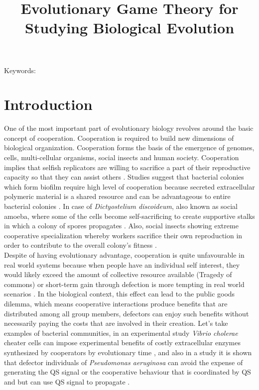 \documentclass{article}
\title{\vspace*{-22mm}\bf Evolutionary Game Theory for Studying Biological Evolution}
\date{}
\begin{document}
\linenumbers
\maketitle




\noindent
Keywords: 


\tableofcontents
\section{Introduction}
One of the most important part of evolutionary biology revolves around the basic concept of cooperation. Cooperation is required to build new dimensions of biological organization. Cooperation forms the basis of the emergence of genomes, cells, multi-cellular organisms, social insects and human society. Cooperation implies that selfish replicators are willing to sacrifice a part of their reproductive capacity so that they can assist others \citep{Nowak2006}.
Studies suggest that bacterial colonies which form biofilm require high level of cooperation because secreted extracellular polymeric material is a shared resource and can be advantageous to entire bacterial colonies \citep{Xavier2007}. In case of \textit{Dictyostelium discoideum}, also known as social amoeba, where some of the cells become self-sacrificing to create supportive stalks in which a colony of spores propagates \citep{Medina2024}. Also, social insects showing extreme cooperative specialization whereby workers sacrifice their own reproduction in order to contribute to the overall colony's fitness \citep{Fischman2011}.\\
Despite of having evolutionary advantage, cooperation is quite unfavourable in real world systems because when people have an individual self interest, they would likely exceed the amount of collective resource available (Tragedy of commons) or short-term gain through defection is more tempting in real world scenarios \citep{Rankin2007}.
In the biological context, this effect can lead to the public goods dilemma, which means cooperative interactions produce benefits that are distributed among all group members, defectors can enjoy such benefits without necessarily paying the costs that are involved in their creation. 
Let's take examples of bacterial communities, in an experimental study  \textit{Vibrio cholerae} cheater cells can impose experimental benefits of costly extracellular enzymes synthesized by cooperators by evolutionary time \citep{Schluter2015}, and also in a study it is shown that defector individuals of \textit{Pseudomonas aeruginosa} can avoid the expense of generating the QS signal or the cooperative behaviour that is coordinated by QS and but can use QS signal to propagate \citep{Diggle2007}.\\
\end{document}
